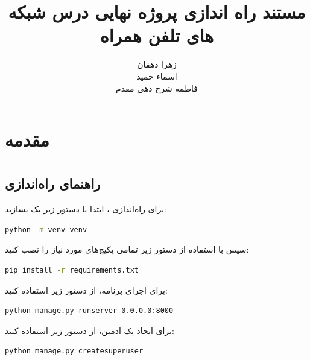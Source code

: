\documentclass{report}
\title{مستند راه اندازی پروژه نهایی درس شبکه های تلفن همراه}
\author{زهرا دهقان\\اسماء حمید\\فاطمه شرح دهی مقدم}
\begin{document}
\Godpage
\maketitle
{}
\tableofcontents


\chapter{مقدمه}








\chapter{ }
\section{راهنمای راه‌اندازی }

برای راه‌اندازی ، ابتدا با دستور زیر یک  بسازید:

\begin{lstlisting}[language=bash]
python -m venv venv
\end{lstlisting}

سپس با استفاده از دستور زیر تمامی پکیج‌های مورد نیاز را نصب کنید:

\begin{lstlisting}[language=bash]
pip install -r requirements.txt
\end{lstlisting}

برای اجرای برنامه، از دستور زیر استفاده کنید:

\begin{lstlisting}[language=bash]
python manage.py runserver 0.0.0.0:8000
\end{lstlisting}

برای ایجاد یک ادمین، از دستور زیر استفاده کنید:

\begin{lstlisting}[language=bash]
python manage.py createsuperuser
\end{lstlisting}


\chapter{ }

\chapter{ }
\end{document}
